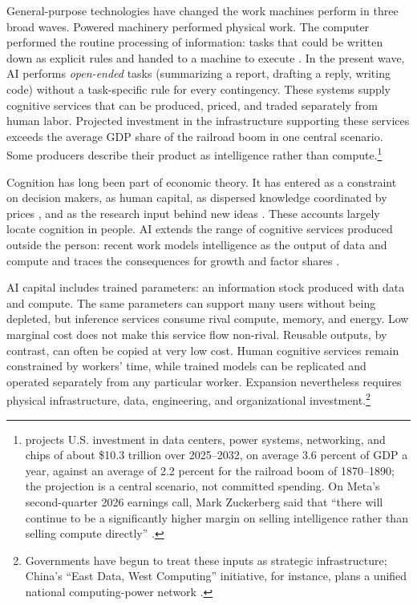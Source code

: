 \documentclass[12pt]{article}
\theoremstyle{plain}
\theoremstyle{definition}
\theoremstyle{remark}
\begin{document}
General-purpose technologies have changed the work machines perform in
three broad waves. Powered
machinery performed physical work. The computer performed the routine
processing of information: tasks that could be written down as explicit
rules and handed to a machine to execute \citep{AutorLevyMurnane2003}.
In the present wave, AI performs \emph{open-ended} tasks (summarizing
a report, drafting a reply, writing code) without a task-specific rule
for every contingency. These systems supply cognitive services that can be produced, priced,
and traded separately from human labor. Projected investment in the infrastructure supporting these services
exceeds the average GDP share of the railroad boom in one central
scenario. Some producers describe their product as intelligence rather
than compute.\footnote{%
\citet{VanNieuwerburgh2026BrookingsAICapex} projects U.S. investment in
data centers, power systems, networking, and chips of about \$10.3
trillion over 2025--2032, on average 3.6 percent of GDP a year, against
an average of 2.2 percent for the railroad boom of 1870--1890; the
projection is a central scenario, not committed spending. On Meta's
second-quarter 2026 earnings call, Mark Zuckerberg said that ``there
will continue to be a significantly higher margin on selling
intelligence rather than selling compute directly''
\citep{MetaQ22026Call}.}

Cognition has long been part of economic theory. It has entered as a constraint
on decision makers, as human capital, as dispersed knowledge
coordinated by prices \citep{Hayek1945}, and as the research input
behind new ideas \citep{Romer1990}. These accounts largely locate cognition in people. AI extends the
range of cognitive services produced outside the person: recent work
models intelligence as the output of data and compute
\citep{TrammellKorinek2023} and traces the consequences
for growth and factor shares \citep{AghionJonesJones2019,
Acemoglu2024SimpleMacroAI, ChenLinChen2019AIAging}.

AI capital includes trained parameters: an information stock produced
with data and compute. The same parameters can support many users
without being depleted, but inference services consume rival compute,
memory, and energy. Low marginal cost does not make this service flow
non-rival. Reusable outputs, by contrast, can often be copied at very
low cost. Human cognitive services remain constrained by workers'
time, while trained models can be replicated and operated separately
from any particular worker. Expansion nevertheless requires physical
infrastructure, data, engineering, and organizational investment.\footnote{%
Governments have begun to treat these inputs as strategic infrastructure;
China's ``East Data, West Computing'' initiative, for instance, plans a
unified national computing-power network
\citep{ChinaComputingPowerNetwork2023}.}
\end{document}
